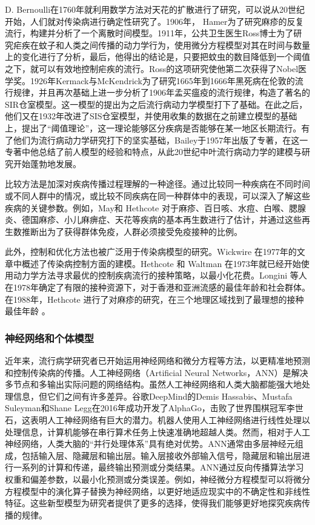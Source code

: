 D. Bernoulli在1760年就利用数学方法对天花的扩散进行了研究，可以说从20世纪开始，人们就对传染病进行确定性研究了。1906年， Hamer为了研究麻疹的反复流行，构建并分析了一个离散时间模型。1911年，公共卫生医生Ross博士为了研究疟疾在蚊子和人类之间传播的动力学行为，使用微分方程模型对其在时间与数量上的变化进行了分析，最后，他得出的结论是，只要把蚊虫的数目降低到一个阈值之下，就可以有效地控制疟疾的流行。Ross的这项研究使他第二次获得了Nobel医学奖。1926年Kermack与McKendrick为了研究1665年到1666年黑死病在伦敦的流行规律，并且再次基础上进一步分析了1906年孟买瘟疫的流行规律，构造了著名的SIR仓室模型。这一模型的提出为之后流行病动力学模型打下了基础。在此之后，他们又在1932年改进了SIS仓室模型，并使用收集的数据在之前建立模型的基础上，提出了“阈值理论”，这一理论能够区分疾病是否能够在某一地区长期流行。有了他们为流行病动力学研究打下的坚实基础，Bailey于1957年出版了专著，在这一专著中他总结了前人模型的经验和特点，从此20世纪中叶流行病动力学的建模与研究开始蓬勃地发展。

比较方法是加深对疾病传播过程理解的一种途径。通过比较同一种疾病在不同时间或不同人群中的情况，或比较不同疾病在同一种群体中的表现，可以深入了解这些疾病的关键参数。例如，May和 Hethcote 对于麻疹、百日咳、水痘、白喉、腮腺炎、德国麻疹、小儿麻痹症、天花等疾病的基本再生数进行了估计，并通过这些再生数推断出为了获得群体免疫，人群必须接受免疫接种的比例。

此外，控制和优化方法也被广泛用于传染病模型的研究。Wickwire 在1977年的文章中概述了传染病控制方面的建模。Hethcote 和 Waltman 在1973年就已经开始使用动力学方法寻求最优的控制疾病流行的接种策略，以最小化花费。Longini 等人在1978年确定了有限的接种资源下，对于香港和亚洲流感的最佳年龄和社会群体。在1988年，Hethcote 进行了对麻疹的研究，在三个地理区域找到了最理想的接种最佳年龄 。

\subsubsection{神经网络和个体模型}

近年来，流行病学研究者已开始运用神经网络和微分方程等方法，以更精准地预测和控制传染病的传播。人工神经网络（Artificial Neural Networks，ANN）是解决多节点和多输出实际问题的网络结构。虽然人工神经网络和人类大脑都能强大地处理信息，但它们之间有许多差异。谷歌DeepMind的Demis Hassabis、Mustafa Suleyman和Shane Legg在2016年成功开发了AlphaGo，击败了世界围棋冠军李世石，这表明人工神经网络有巨大的潜力。机器人使用人工神经网络进行线性处理以处理信息，计算机能够在串行算术任务上快速准确地超越人类。然而，相对于人工神经网络，人类大脑的“并行处理体系”具有绝对优势。ANN通常由多层神经元组成，包括输入层、隐藏层和输出层。输入层接收外部输入信号，隐藏层和输出层进行一系列的计算和传递，最终输出预测或分类结果。ANN通过反向传播算法学习权重和偏差参数，以最小化预测或分类误差。例如，神经微分方程模型可以将微分方程模型中的演化算子替换为神经网络，以更好地适应现实中的不确定性和非线性特征。这些新型模型为研究者提供了更多的选择，使得我们能够更好地探究疾病传播的规律。

